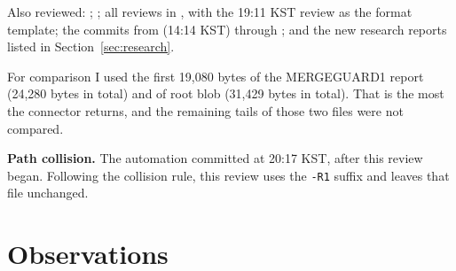 \documentclass[11pt]{article}
\begin{document}
Also reviewed: ; ; all reviews in
, with the 19:11 KST review as the
format template; the commits from  (14:14 KST) through
; and the new research reports listed in
Section~\ref{sec:research}.

For comparison I used the first 19{,}080 bytes of the MERGEGUARD1 report
(24{,}280 bytes in total) and of root blob  (31{,}429 bytes
in total). That is the most the connector returns, and the remaining
tails of those two files were not compared.

\textbf{Path collision.} The automation committed
 at 20:17 KST, after this review
began. Following the  collision rule, this review uses
the \texttt{-R1} suffix and leaves that file unchanged.

\section{Observations}
\end{document}
